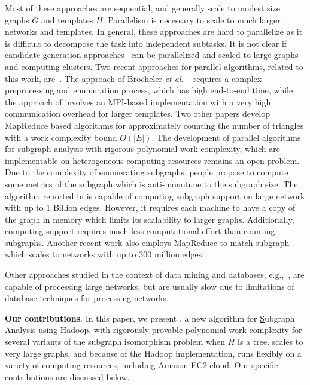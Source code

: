 Most of these approaches are
sequential, and generally  scale to modest size graphs $G$  and templates $H$.
Parallelism is necessary to scale to much larger networks and templates.
In general, these approaches are  hard to parallelize as it is 
difficult to decompose the task into independent subtasks. It is not clear if
candidate generation approaches~\cite{kuramochi2005finding, huan2004spin,
yan2005mining} can be parallelized and scaled to large graphs and computing
clusters. Two recent approaches for parallel algorithms, related to this work,
are~\cite{brocheler2010cosi, zhao2010subgraph}. The approach of Br\"{o}cheler
\emph{et al}. ~\cite{brocheler2010cosi} requires a complex preprocessing and
enumeration process, which has high end-to-end time, while the approach of
\cite{zhao2010subgraph} involves an MPI-based implementation with a very high
communication overhead for larger templates.  Two other papers
\cite{suri2011counting, pagh2011colorful} develop MapReduce based algorithms for
approximately counting the number of triangles with a work complexity bound
$O(|E|)$. The development of  parallel algorithms for
subgraph analysis with rigorous polynomial work complexity, which are
implementable on heterogeneous computing resources remains an open problem.
Due to the complexity of
enumerating subgraphs, people propose to compute some metrics of the subgraph
which is anti-monotune to the subgraph size. The algorithm  reported in
\cite{abdelhamid2016scalemine} is capable of computing subgraph support on
 large network with up to 1 Billion edges. However, it requires each
machine to have a copy of the graph in memory which limits its scalability to larger graphs.
Additionally, computing support requires much less computational effort
than counting subgraphs. Another recent work also employs MapReduce to match
subgraph~\cite{suo2016towards} which scales to networks with up to 300 million
edges. 

Other approaches studied in the context of data mining and databases,
e.g.,~\cite{sakr2009graphrel, ronen2009evaluating, brocheler2010cosi},
are capable of processing large networks, but are usually slow due to
limitations of database techniques for processing networks.

\noindent
\textbf{Our contributions}.
In this paper, we present \sahad{}, a new algorithm for
\underline{S}ubgraph \underline{A}nalysis using \underline{Had}oop, with
rigorously provable polynomial work complexity for several variants of the subgraph
isomorphism problem when $H$ is a tree.
\sahad{} scales to very large graphs, and because of the Hadoop
implementation, runs flexibly on a variety of computing resources, including
Amazon EC2 cloud. Our specific contributions are discussed below.


